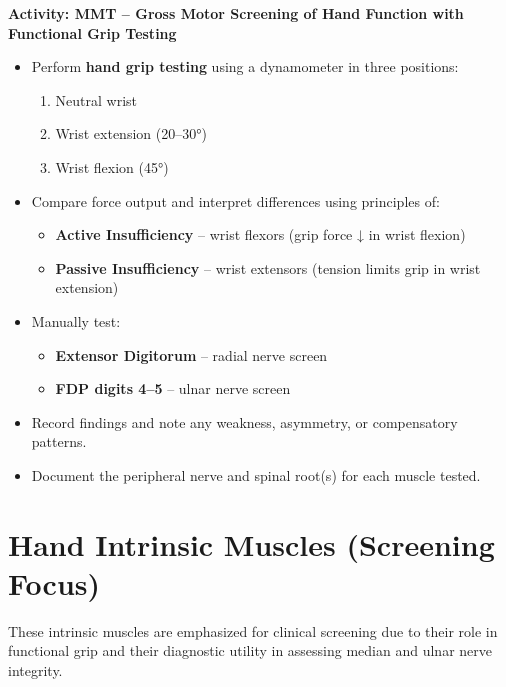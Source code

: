 \begin{labactivitybox}
\textbf{Activity: MMT – Gross Motor Screening of Hand Function with Functional Grip Testing}

\begin{itemize}
  \item Perform \textbf{hand grip testing} using a dynamometer in three positions:
  \begin{enumerate}
    \item Neutral wrist
    \item Wrist extension (20–30°)
    \item Wrist flexion (45°)
  \end{enumerate}
  \item Compare force output and interpret differences using principles of:
  \begin{itemize}
    \item \textbf{Active Insufficiency} – wrist flexors (grip force ↓ in wrist flexion)
    \item \textbf{Passive Insufficiency} – wrist extensors (tension limits grip in wrist extension)
  \end{itemize}
  \item Manually test:
    \begin{itemize}
      \item \textbf{Extensor Digitorum} – radial nerve screen
      \item \textbf{FDP digits 4–5} – ulnar nerve screen
    \end{itemize}
  \item Record findings and note any weakness, asymmetry, or compensatory patterns.
  \item Document the peripheral nerve and spinal root(s) for each muscle tested.
\end{itemize}
\end{labactivitybox}


\section*{Hand Intrinsic Muscles (Screening Focus)}

\noindent
These intrinsic muscles are emphasized for clinical screening due to their role in functional grip and their diagnostic utility in assessing median and ulnar nerve integrity.

